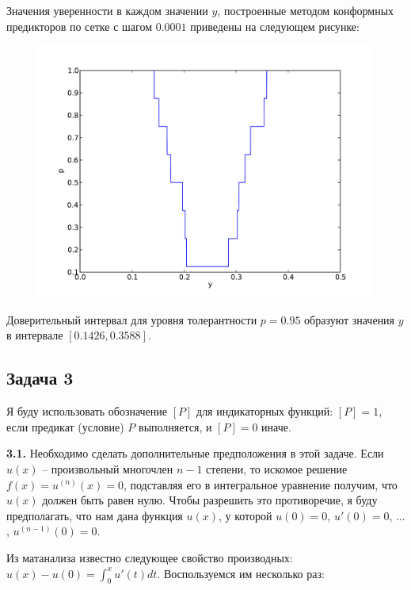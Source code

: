 \documentclass[a4paper, 12pt, onepage]{article}
\begin{document}
Значения уверенности в каждом значении $y$, построенные методом конформных
предикторов по сетке с шагом $0.0001$ приведены на следующем рисунке:
\begin{figure}[h]
  \centering
  \includegraphics[scale=0.7]{figure2.pdf}
\end{figure}

Доверительный интервал для уровня толерантности $p=0.95$ образуют
значения $y$ в интервале $[0.1426, 0.3588]$.

\newpage
\subsection*{Задача 3}

Я буду использовать обозначение $[P]$ для индикаторных функций: $[P] = 1$, если предикат (условие) $P$ выполняется,
и $[P] = 0$ иначе.

\textbf{3.1.} Необходимо сделать дополнительные предположения в этой задаче.
Если $u(x)$ -- произвольный многочлен $n-1$ степени, то искомое решение $f(x) = u^{(n)}(x) = 0$,
подставляя его в интегральное уравнение получим, что $u(x)$ должен быть равен нулю.
Чтобы разрешить это противоречие, я буду предполагать, что нам дана
функция $u(x)$, у которой $u(0) = 0$, $u'(0) = 0$, $\ldots$, $u^{(n-1)}(0) = 0$.

Из матанализа известно следующее свойство производных:
$u(x) - u(0) = \int_0^x u'(t) dt$. Воспользуемся им несколько раз:
\end{document}
